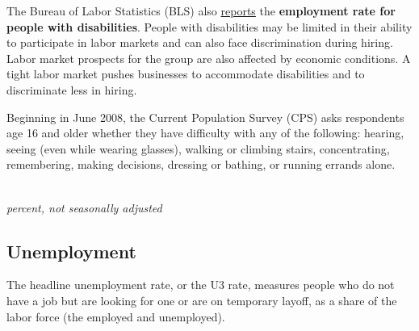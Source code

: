 \begin{minipage}{0.76\textwidth} 
\small The Bureau of Labor Statistics (BLS) also \href{https://data.bls.gov/timeseries/LNU02374597}{reports} the \textbf{employment rate for people with disabilities}. People with disabilities may be limited in their ability to participate in labor markets and can also face discrimination during hiring. Labor market prospects for the group are also affected by economic conditions. A tight labor market pushes businesses to accommodate disabilities and to discriminate less in hiring.

Beginning in June 2008, the Current Population Survey (CPS) asks respondents age 16 and older whether they have difficulty with any of the following: hearing, seeing (even while wearing glasses), walking or climbing stairs, concentrating, remembering, making decisions, dressing or bathing, or running errands alone.  
\end{minipage}

\begin{minipage}{0.40\textwidth}
\\
\footnotesize{\textit{percent, not seasonally adjusted}}\\
\end{minipage} \hspace{5mm}
\begin{minipage}{0.32\textwidth}
\small  

 
\end{minipage}
\newpage
\vspace*{-10mm}

\subsection*{Unemployment}
\begin{minipage}{0.76\textwidth} 
\hypertarget{labu}{\label{labu}}
\small The headline unemployment rate, or the U3 rate, measures people who do not have a job but are looking for one or are on temporary layoff, as a share of the labor force (the employed and unemployed). 
\end{minipage}
\vspace*{0.5mm}

